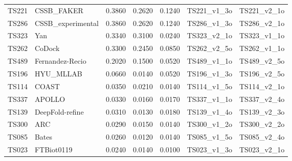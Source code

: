 \begin{table}[ht]
{\begin{tabular}{llrrrll}
TS221 & CSSB\_FAKER & 0.3860 & 0.2620 & 0.1240 & TS221\_v1\_3o & TS221\_v2\_1o \\ 
TS286 & CSSB\_experimental & 0.3860 & 0.2620 & 0.1240 & TS286\_v1\_3o & TS286\_v2\_1o \\ 
TS323 & Yan & 0.3340 & 0.3100 & 0.0240 & TS323\_v2\_1o & TS323\_v1\_1o \\ 
TS262 & CoDock & 0.3300 & 0.2450 & 0.0850 & TS262\_v2\_5o & TS262\_v1\_1o \\ 
TS489 & Fernandez-Recio & 0.2020 & 0.1500 & 0.0520 & TS489\_v1\_1o & TS489\_v2\_5o \\ 
TS196 & HYU\_MLLAB & 0.0660 & 0.0140 & 0.0520 & TS196\_v1\_3o & TS196\_v2\_5o \\ 
TS114 & COAST & 0.0350 & 0.0210 & 0.0140 & TS114\_v1\_5o & TS114\_v2\_1o \\ 
TS337 & APOLLO & 0.0330 & 0.0160 & 0.0170 & TS337\_v1\_1o & TS337\_v2\_4o \\ 
TS139 & DeepFold-refine & 0.0310 & 0.0130 & 0.0180 & TS139\_v1\_4o & TS139\_v2\_3o \\ 
TS300 & ARC & 0.0290 & 0.0150 & 0.0140 & TS300\_v1\_2o & TS300\_v2\_2o \\ 
TS085 & Bates & 0.0260 & 0.0120 & 0.0140 & TS085\_v1\_5o & TS085\_v2\_4o \\ 
TS023 & FTBiot0119 & 0.0240 & 0.0140 & 0.0100 & TS023\_v1\_3o & TS023\_v2\_1o \\ 
\bottomrule
\end{tabular}%
}
\end{table}

